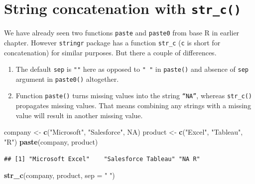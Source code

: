 \documentclass[
]{book}
\newenvironment{Shaded}{\begin{snugshade}}{\end{snugshade}}
\newcommand{\AttributeTok}[1]{\textcolor[rgb]{0.13,0.29,0.53}{#1}}
\newcommand{\ConstantTok}[1]{\textcolor[rgb]{0.56,0.35,0.01}{#1}}
\newcommand{\FunctionTok}[1]{\textcolor[rgb]{0.13,0.29,0.53}{\textbf{#1}}}
\newcommand{\NormalTok}[1]{#1}
\newcommand{\OtherTok}[1]{\textcolor[rgb]{0.56,0.35,0.01}{#1}}
\newcommand{\StringTok}[1]{\textcolor[rgb]{0.31,0.60,0.02}{#1}}
\providecommand{\tightlist}{%
  \setlength{\itemsep}{0pt}\setlength{\parskip}{0pt}}
\begin{document}
\hypertarget{string-concatenation-with-str_c}{%
\section{\texorpdfstring{String concatenation with \texttt{str\_c()}}{String concatenation with str\_c()}}\label{string-concatenation-with-str_c}}

We have already seen two functions \texttt{paste} and \texttt{paste0} from base R in earlier chapter. However \texttt{stringr} package has a function \texttt{str\_c} (\texttt{c} is short for concatenation) for similar purposes. But there a couple of differences.

\begin{enumerate}
\def\labelenumi{\arabic{enumi}.}
\tightlist
\item
  The default \texttt{sep} is \texttt{""} here as opposed to \texttt{"\ "} in \texttt{paste()} and absence of \texttt{sep} argument in \texttt{paste0()} altogether.
\item
  Function \texttt{paste()} turns missing values into the string \texttt{“NA”}, whereas \texttt{str\_c()} propagates missing values. That means combining any strings with a missing value will result in another missing value.
\end{enumerate}

\begin{Shaded}
\begin{Highlighting}[]
\NormalTok{company }\OtherTok{\textless{}{-}} \FunctionTok{c}\NormalTok{(}\StringTok{"Microsoft"}\NormalTok{, }\StringTok{"Salesforce"}\NormalTok{, }\ConstantTok{NA}\NormalTok{)}
\NormalTok{product }\OtherTok{\textless{}{-}} \FunctionTok{c}\NormalTok{(}\StringTok{"Excel"}\NormalTok{, }\StringTok{"Tableau"}\NormalTok{, }\StringTok{"R"}\NormalTok{)}
\FunctionTok{paste}\NormalTok{(company, product)}
\end{Highlighting}
\end{Shaded}

\begin{verbatim}
## [1] "Microsoft Excel"    "Salesforce Tableau" "NA R"
\end{verbatim}

\begin{Shaded}
\begin{Highlighting}[]
\FunctionTok{str\_c}\NormalTok{(company, product, }\AttributeTok{sep =} \StringTok{" "}\NormalTok{)}
\end{Highlighting}
\end{Shaded}
\end{document}
